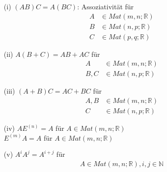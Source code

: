 \documentclass[11pt]{report}
\newcommand*\Zb[1] {\mathbb{#1}}
\begin{document}
\begin{lemma}
\label{lemma122}

\begin{itemize}
 \item[(i)] $(AB)C = A(BC)$: Assoziativität für
\begin{align}
 A &\in Mat(m,n; \Zb{R}) \\ 
 B &\in Mat(n,p; \Zb{R}) \\
 C &\in Mat(p,q; \Zb{R}) 
\end{align}

 \item[(ii)] $A(B+C) = AB + AC$ für
\begin{align}
 A &\in Mat(m,n; \Zb{R}) \\ 
 B, C &\in Mat(n,p; \Zb{R})
\end{align}

 \item[(iii)] $(A+B)C = AC + BC$ für 
\begin{align}
 A, B &\in Mat(m,n; \Zb{R}) \\ 
 C &\in Mat(n,p; \Zb{R})
\end{align}

 \item[(iv)] $AE^{(n)} = A$ für $A \in Mat(m,n;\Zb{R})$\\
$E^{(m)}A = A$ für $A \in Mat(m,n;\Zb{R})$

 \item[(v)] $A^i A^j = A^{i+j}$ für
\begin{align}
 A \in Mat(m,n; \Zb{R}), i,j \in \Zb{N} 
\end{align}
\end{itemize}
\end{lemma}
\end{document}
